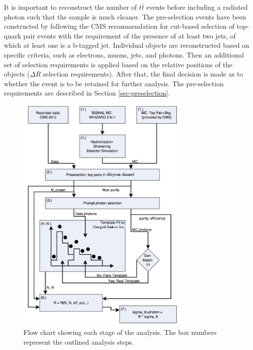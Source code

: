 It is important to reconstruct the number of $t\bar{t}$ events before including a radiated photon such that the sample is much cleaner. 
The pre-selection events have been constructed by following the CMS recommendation for cut-based selection of top-quark pair events with the requirement of the presence of at least two jets, of which at least one is a b-tagged jet. Individual objects are reconstructed based on specific criteria, such as electrons, muons, jets, and photons. Then an additional set of selection requirements is applied based on the relative positions of the objects ($\Delta R$ selection requirements). After that, the final decision is made as to whether the event is to be retained for further analysis. The pre-selection requirements are described in Section \ref{sec-preselection}.

\begin{figure}
\begin{center}
\includegraphics[width=0.75\textwidth]{Figures/AnalysisFlowChart2.png}
\end{center}
\caption{Flow chart showing each stage of the analysis. The box numbers represent the outlined
analysis steps.}
\label{fig-AnalysisFlowChart}
\end{figure}

